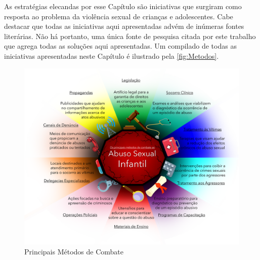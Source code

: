 As estratégias elecandas por esse Capítulo são iniciativas que surgiram como resposta ao problema da violência sexual de crianças e adolescentes. Cabe destacar que todas as iniciativas aqui apresentadas advém de inúmeras fontes literárias. Não há portanto, uma única fonte de pesquisa citada por este trabalho que agrega todas as soluções aqui apresentadas. Um compilado de todas as iniciativas apresentadas neste Capítulo é ilustrado pela \autoref{fig:Metodos}.




\begin{figure}[htb]
  
	\caption{\label{fig:Metodos}Principais Métodos de Combate}\vspace{-0.2cm}
  \begin{adjustwidth}{-4.2cm}{-0.0cm}
    \includegraphics[scale=0.65]{./Figuras/MétodosCombate.pdf}
	\end{adjustwidth}\vspace{-1.5cm}

\end{figure}

\newpage




